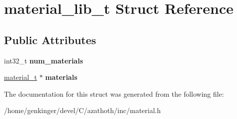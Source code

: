 \hypertarget{structmaterial__lib__t}{}\section{material\+\_\+lib\+\_\+t Struct Reference}
\label{structmaterial__lib__t}
\subsection*{Public Attributes}
\begin{DoxyCompactItemize}
\item 
\mbox{\label{structmaterial__lib__t_a0190b49f52dbd2d9aa90de0a2a43b583}} 
int32\+\_\+t {\bfseries num\+\_\+materials}
\item 
\mbox{\label{structmaterial__lib__t_a61dd8ea7892a175a18a01d680dcaeb23}} 
\mbox{\hyperlink{structmaterial__t}{material\+\_\+t}} $\ast$ {\bfseries materials}
\end{DoxyCompactItemize}


The documentation for this struct was generated from the following file\+:\begin{DoxyCompactItemize}
\item 
/home/genkinger/devel/\+C/azathoth/inc/material.\+h\end{DoxyCompactItemize}
